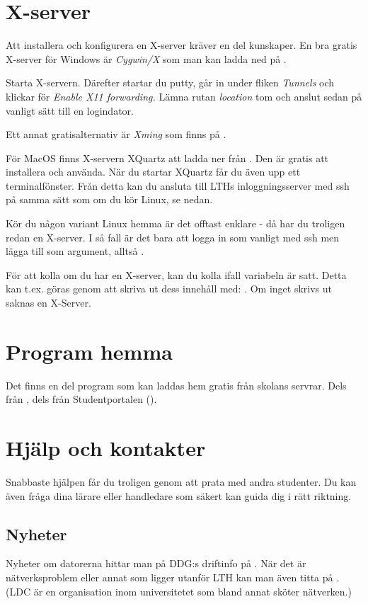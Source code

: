\documentclass[a4paper,twocolumn]{book}
\begin{document}
\section{X-server}

Att installera och konfigurera en X-server kräver en del kunskaper. En bra
gratis X-server för Windows är \emph{Cygwin/X} som man kan ladda ned på
.

Starta X-servern. Därefter startar du putty, går in under fliken
\emph{Tunnels} och klickar för \emph{Enable X11 forwarding.} Lämna rutan
\emph{location} tom och anslut sedan på vanligt sätt till en logindator.

Ett annat gratisalternativ är \emph{Xming} som finns på
.

För MacOS finns X-servern XQuartz att ladda ner från . Den är gratis att installera och använda. När du startar XQuartz får du även upp ett terminalfönster. Från detta kan du ansluta till LTHs inloggningsserver med ssh på samma sätt som om du kör Linux, se nedan.

Kör du någon variant Linux hemma är det offtast enklare - då har du troligen redan
en X-server. I så fall är det bara att logga in som vanligt med ssh men lägga
till  som argument, alltså .

För att kolla om du har en X-server, kan du kolla ifall  variabeln är satt.
Detta kan t.ex. göras genom att skriva ut dess innehåll med: .
Om inget skrivs ut saknas en X-Server.

\section{Program hemma}

Det finns en del program som kan laddas hem gratis från skolans servrar. Dels
från , dels från Studentportalen
().

\section{Hjälp och kontakter}

Snabbaste hjälpen får du troligen genom att prata med andra studenter. Du kan även fråga dina lärare eller handledare som säkert kan guida dig i rätt riktning.

\subsection{Nyheter}
Nyheter om datorerna hittar man på DDG:s driftinfo på
. När det är nätverksproblem eller annat som ligger
utanför LTH kan man även titta på . (LDC är en
organisation inom universitetet som bland annat sköter nätverken.)
\end{document}
